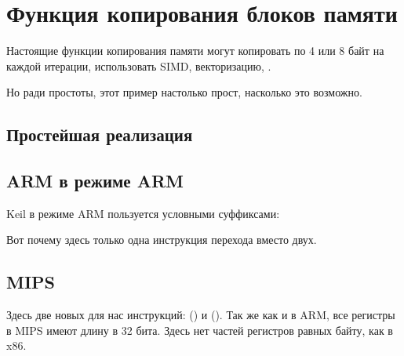 ﻿\section{Функция копирования блоков памяти}
\label{loop_memcpy}

Настоящие функции копирования памяти могут копировать по 4 или 8 байт на каждой итерации, использовать \ac{SIMD},
векторизацию, \etc{}.

Но ради простоты, этот пример настолько прост, насколько это возможно.



\subsection{Простейшая реализация}







\subsection{ARM в режиме ARM}

Keil в режиме ARM пользуется условными суффиксами:



Вот почему здесь только одна инструкция перехода вместо двух.

\subsection{MIPS}



Здесь две новых для нас инструкций:  () и  ().
Так же как и в ARM, все регистры в MIPS имеют длину в 32 бита. Здесь нет частей регистров равных байту,
как в x86.

